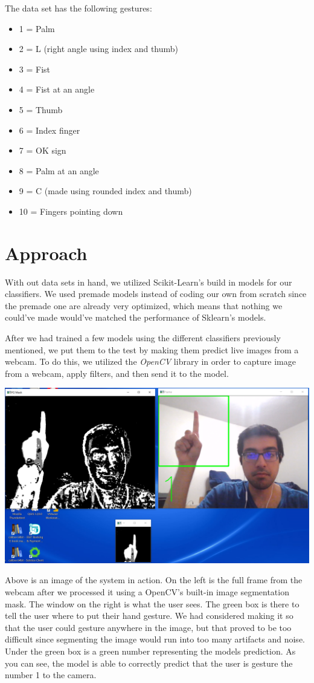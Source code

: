 \documentclass[letterpaper]{article} %
\begin{document}
The data set has the following gestures:

\begin{itemize}
	\item 1 = Palm
	\item 2 = L (right angle using index and thumb)
	\item 3 = Fist
	\item 4 = Fist at an angle
	\item 5 = Thumb
	\item 6 = Index finger
	\item 7 = OK sign
	\item 8 = Palm at an angle
	\item 9 = C (made using rounded index and thumb)
	\item 10 = Fingers pointing down
\end{itemize}


\section{Approach}
With out data sets in hand, we utilized Scikit-Learn's build in models for our classifiers. We used premade models instead of coding our own from scratch since the premade one are already very optimized, which means that nothing we could've made would've matched the performance of Sklearn's models.  

After we had trained a few models using the different classifiers previously mentioned, we put them to the test by making them predict live images from a webcam. To do this, we utilized the \textit{OpenCV} library in order to capture image from a webcam, apply filters, and then send it to the model. 

\includegraphics[scale=0.23]{handtest1}

Above is an image of the system in action. On the left is the full frame from the webcam after we processed it using a OpenCV's built-in image segmentation mask. The window on the right is what the user sees. The green box is there to tell the user where to put their hand gesture. We had considered making it so that the user could gesture anywhere in the image, but that proved to be too difficult since segmenting the image would run into too many artifacts and noise. Under the green box is a green number representing the models prediction. As you can see, the model is able to correctly predict that the user is gesture the number 1 to the camera.
\end{document}
